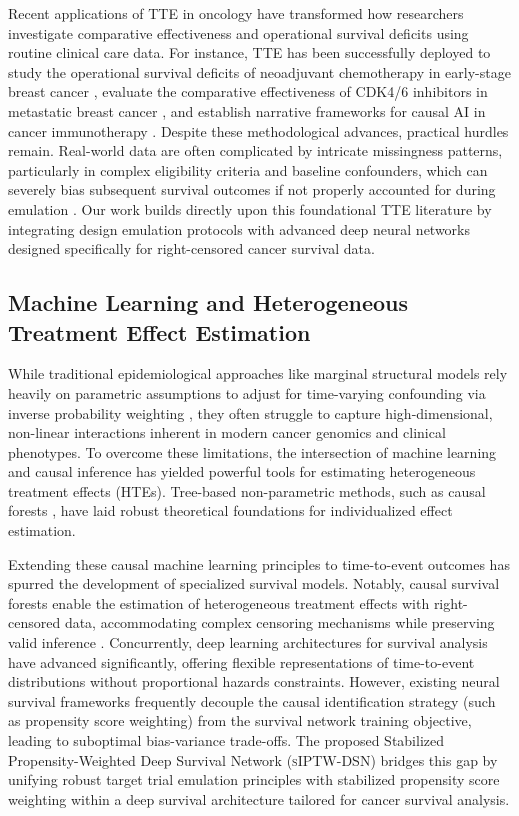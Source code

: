 \documentclass[10pt,twocolumn]{article}
\begin{document}
Recent applications of TTE in oncology have transformed how researchers investigate comparative effectiveness and operational survival deficits using routine clinical care data. For instance, TTE has been successfully deployed to study the operational survival deficits of neoadjuvant chemotherapy in early-stage breast cancer \cite{target_ref, ref_1}, evaluate the comparative effectiveness of CDK4/6 inhibitors in metastatic breast cancer \cite{ref_2}, and establish narrative frameworks for causal AI in cancer immunotherapy \cite{ref_3}. Despite these methodological advances, practical hurdles remain. Real-world data are often complicated by intricate missingness patterns, particularly in complex eligibility criteria and baseline confounders, which can severely bias subsequent survival outcomes if not properly accounted for during emulation \cite{ref_4}. Our work builds directly upon this foundational TTE literature by integrating design emulation protocols with advanced deep neural networks designed specifically for right-censored cancer survival data.

\subsection{Machine Learning and Heterogeneous Treatment Effect Estimation}
While traditional epidemiological approaches like marginal structural models rely heavily on parametric assumptions to adjust for time-varying confounding via inverse probability weighting \cite{robins2000marginal}, they often struggle to capture high-dimensional, non-linear interactions inherent in modern cancer genomics and clinical phenotypes. To overcome these limitations, the intersection of machine learning and causal inference has yielded powerful tools for estimating heterogeneous treatment effects (HTEs). Tree-based non-parametric methods, such as causal forests \cite{wager2018estimation}, have laid robust theoretical foundations for individualized effect estimation.

Extending these causal machine learning principles to time-to-event outcomes has spurred the development of specialized survival models. Notably, causal survival forests enable the estimation of heterogeneous treatment effects with right-censored data, accommodating complex censoring mechanisms while preserving valid inference \cite{cui2023estimating}. Concurrently, deep learning architectures for survival analysis have advanced significantly, offering flexible representations of time-to-event distributions without proportional hazards constraints. However, existing neural survival frameworks frequently decouple the causal identification strategy (such as propensity score weighting) from the survival network training objective, leading to suboptimal bias-variance trade-offs. The proposed Stabilized Propensity-Weighted Deep Survival Network (\textsc{sIPTW-DSN}) bridges this gap by unifying robust target trial emulation principles with stabilized propensity score weighting within a deep survival architecture tailored for cancer survival analysis.
\end{document}
